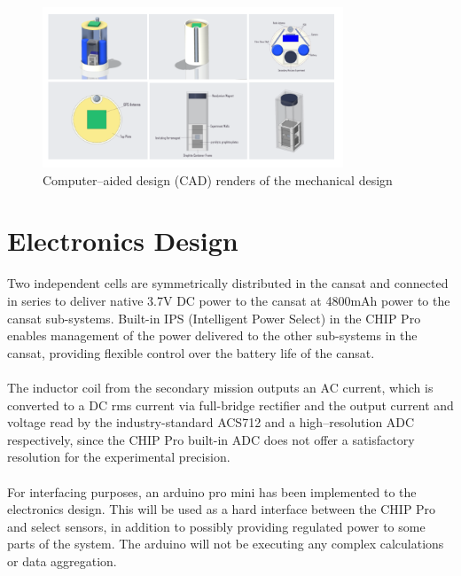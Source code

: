 \documentclass{report}
\begin{document}
		\begin{figure}[H]
			\begin{center}
				\includegraphics[width=0.8\textwidth]{CadRenders}
			\end{center}
			\vspace{-15pt}
			\caption{Computer--aided design (CAD) renders of the mechanical design}
		\end{figure}


	\section{Electronics Design}
		Two independent cells are symmetrically distributed in the cansat and
		connected in series to deliver native 3.7V DC power to the cansat at 
		4800mAh power to the cansat sub-systems.
		Built-in IPS (Intelligent Power Select) in the CHIP Pro enables management
		of the power delivered to the other sub-systems in the cansat, providing
		flexible control over the battery life of the cansat. 
		\\\\
		The inductor coil from the secondary mission outputs an AC current, which
		is converted to a DC rms current via full-bridge rectifier and the output
		current and voltage read by the industry-standard ACS712 and a 
		high--resolution ADC respectively, since the CHIP Pro built-in ADC 
		does not offer a satisfactory resolution for the experimental precision.
		\\\\
		{\color{blue}For interfacing purposes, an arduino pro mini has been
		implemented to the electronics design. This will be used as a hard interface
		between the CHIP Pro and select sensors, in addition to possibly providing
		regulated power to some parts of the system. The arduino will not be 
		executing any complex calculations or data aggregation.}
		
\end{document}
